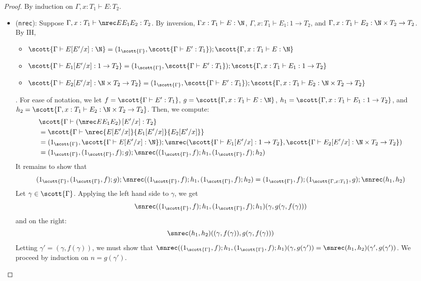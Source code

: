 \semsubst*
\begin{proof}
By induction on $\Gamma, x : T_1 \vdash E : T_2$.
\begin{itemize}
  \item (\texttt{nrec}): Suppose $\Gamma, x : T_1 \vdash \nrec E {E_1} {E_2} : T_2$. By inversion, $\Gamma x : T_1 \vdash E : \N $, $\Gamma, x : T_1 \vdash E_1 : 1 \to T_2$, and $\Gamma, x: T_1 \vdash E_2 : \N \times T_2 \to T_2$. By IH,
  \begin{itemize}
   \item  $\scott{\Gamma \vdash E[E'/x] : \N} = (1_{\scott{\Gamma}},\scott{\Gamma \vdash E' : T_1}) ; \scott{\Gamma, x : T_1 \vdash E : \N}$  
   \item $\scott{\Gamma \vdash E_1[E'/x] : 1 \to T_2} = (1_{\scott{\Gamma}},\scott{\Gamma \vdash E' : T_1}) ; \scott{\Gamma, x : T_1 \vdash E_1 : 1 \to T_2}$
   \item $\scott{\Gamma \vdash E_2[E'/x] : \N \times T_2 \to T_2} = (1_{\scott{\Gamma}},\scott{\Gamma \vdash E' : T_1}) ; \scott{\Gamma, x: T_1 \vdash E_2 : \N \times T_2 \to T_2}$
  \end{itemize}. For ease of notation, we let $f = \scott{\Gamma \vdash E' : T_1}$, $g = \scott{\Gamma, x : T_1 \vdash E : \N}$, $h_1 =  \scott{\Gamma, x : T_1 \vdash E_1 : 1 \to T_2}$, and $h_2 = \scott{\Gamma, x: T_1 \vdash E_2 : \N \times T_2 \to T_2}$.
  Then, we compute:
  \begin{align*}
  &\scott{\Gamma \vdash \left(\nrec E {E_1} {E_2}\right)[E'/x] : T_2} \\
  &= \scott{\Gamma \vdash \nrec {E[E'/x]} {E_1[E'/x]} {E_2[E'/x]}}\\
  &= (1_{\scott{\Gamma}}, \scott{\Gamma \vdash E[E'/x] : \N}) ; \snrec(\scott{\Gamma \vdash E_1[E'/x] : 1 \to T_2},\scott{\Gamma \vdash E_2[E'/x] : \N \times T_2 \to T_2})\\
  &= (1_{\scott{\Gamma}},(1_{\scott{\Gamma}},f) ; g) ; \snrec((1_{\scott{\Gamma}},f) ; h_1,(1_{\scott{\Gamma}},f) ; h_2)
  \end{align*}
  It remains to show that
  $$
(1_{\scott{\Gamma}},(1_{\scott{\Gamma}},f) ; g) ; \snrec((1_{\scott{\Gamma}},f) ; h_1,(1_{\scott{\Gamma}},f) ; h_2) = (1_{\scott{\Gamma}},f);(1_{\scott{\Gamma,x:T_1}},g);\snrec(h_1,h_2)  
  $$
  Let $\gamma \in \scott{\Gamma}$.
  Applying the left hand side to $\gamma$, we get
  $$
  \snrec((1_{\scott{\Gamma}},f);h_1,(1_{\scott{\Gamma}},f);h_1)(\gamma,g(\gamma,f(\gamma)))
  $$
  and on the right:
  $$
  \snrec(h_1,h_2)((\gamma,f(\gamma)),g(\gamma,f(\gamma)))  
  $$
  Letting $\gamma' = (\gamma,f(\gamma))$, we must show that $\snrec((1_{\scott{\Gamma}},f);h_1,(1_{\scott{\Gamma}},f);h_1)(\gamma,g(\gamma')) = \snrec(h_1,h_2)(\gamma',g(\gamma'))$. We proceed by induction on $n = g(\gamma')$.

\end{itemize}
\end{proof}
